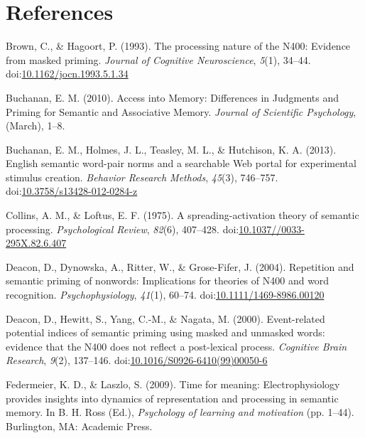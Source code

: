 \documentclass[english,man]{apa6}
\theoremstyle{definition}
\theoremstyle{definition}
\theoremstyle{definition}
\theoremstyle{remark}
\begin{document}
\newpage

\section{References}\label{references}

\setlength{\parindent}{-0.5in} \setlength{\leftskip}{0.5in}

\hypertarget{refs}{}
\hypertarget{ref-Brown1993}{}
Brown, C., \& Hagoort, P. (1993). The processing nature of the N400:
Evidence from masked priming. \emph{Journal of Cognitive Neuroscience},
\emph{5}(1), 34--44.
doi:\href{https://doi.org/10.1162/jocn.1993.5.1.34}{10.1162/jocn.1993.5.1.34}

\hypertarget{ref-Buchanan2010}{}
Buchanan, E. M. (2010). Access into Memory: Differences in Judgments and
Priming for Semantic and Associative Memory. \emph{Journal of Scientific
Psychology}, (March), 1--8.

\hypertarget{ref-Buchanan2013}{}
Buchanan, E. M., Holmes, J. L., Teasley, M. L., \& Hutchison, K. A.
(2013). English semantic word-pair norms and a searchable Web portal for
experimental stimulus creation. \emph{Behavior Research Methods},
\emph{45}(3), 746--757.
doi:\href{https://doi.org/10.3758/s13428-012-0284-z}{10.3758/s13428-012-0284-z}

\hypertarget{ref-Collins1975}{}
Collins, A. M., \& Loftus, E. F. (1975). A spreading-activation theory
of semantic processing. \emph{Psychological Review}, \emph{82}(6),
407--428.
doi:\href{https://doi.org/10.1037//0033-295X.82.6.407}{10.1037//0033-295X.82.6.407}

\hypertarget{ref-Deacon2004}{}
Deacon, D., Dynowska, A., Ritter, W., \& Grose-Fifer, J. (2004).
Repetition and semantic priming of nonwords: Implications for theories
of N400 and word recognition. \emph{Psychophysiology}, \emph{41}(1),
60--74.
doi:\href{https://doi.org/10.1111/1469-8986.00120}{10.1111/1469-8986.00120}

\hypertarget{ref-Deacon2000}{}
Deacon, D., Hewitt, S., Yang, C.-M., \& Nagata, M. (2000). Event-related
potential indices of semantic priming using masked and unmasked words:
evidence that the N400 does not reflect a post-lexical process.
\emph{Cognitive Brain Research}, \emph{9}(2), 137--146.
doi:\href{https://doi.org/10.1016/S0926-6410(99)00050-6}{10.1016/S0926-6410(99)00050-6}

\hypertarget{ref-Federmeier2009}{}
Federmeier, K. D., \& Laszlo, S. (2009). Time for meaning:
Electrophysiology provides insights into dynamics of representation and
processing in semantic memory. In B. H. Ross (Ed.), \emph{Psychology of
learning and motivation} (pp. 1--44). Burlington, MA: Academic Press.
\end{document}
